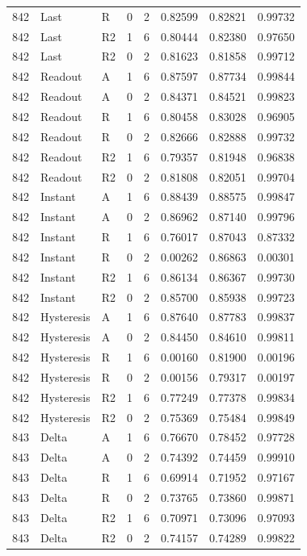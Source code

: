 \begin{longtable}{llllllll}
842 & Last & R & 0 & 2 & 0.82599 & 0.82821 & 0.99732 \\
842 & Last & R2 & 1 & 6 & 0.80444 & 0.82380 & 0.97650 \\
842 & Last & R2 & 0 & 2 & 0.81623 & 0.81858 & 0.99712 \\
842 & Readout & A & 1 & 6 & 0.87597 & 0.87734 & 0.99844 \\
842 & Readout & A & 0 & 2 & 0.84371 & 0.84521 & 0.99823 \\
842 & Readout & R & 1 & 6 & 0.80458 & 0.83028 & 0.96905 \\
842 & Readout & R & 0 & 2 & 0.82666 & 0.82888 & 0.99732 \\
842 & Readout & R2 & 1 & 6 & 0.79357 & 0.81948 & 0.96838 \\
842 & Readout & R2 & 0 & 2 & 0.81808 & 0.82051 & 0.99704 \\
842 & Instant & A & 1 & 6 & 0.88439 & 0.88575 & 0.99847 \\
842 & Instant & A & 0 & 2 & 0.86962 & 0.87140 & 0.99796 \\
842 & Instant & R & 1 & 6 & 0.76017 & 0.87043 & 0.87332 \\
842 & Instant & R & 0 & 2 & 0.00262 & 0.86863 & 0.00301 \\
842 & Instant & R2 & 1 & 6 & 0.86134 & 0.86367 & 0.99730 \\
842 & Instant & R2 & 0 & 2 & 0.85700 & 0.85938 & 0.99723 \\
842 & Hysteresis & A & 1 & 6 & 0.87640 & 0.87783 & 0.99837 \\
842 & Hysteresis & A & 0 & 2 & 0.84450 & 0.84610 & 0.99811 \\
842 & Hysteresis & R & 1 & 6 & 0.00160 & 0.81900 & 0.00196 \\
842 & Hysteresis & R & 0 & 2 & 0.00156 & 0.79317 & 0.00197 \\
842 & Hysteresis & R2 & 1 & 6 & 0.77249 & 0.77378 & 0.99834 \\
842 & Hysteresis & R2 & 0 & 2 & 0.75369 & 0.75484 & 0.99849 \\
843 & Delta & A & 1 & 6 & 0.76670 & 0.78452 & 0.97728 \\
843 & Delta & A & 0 & 2 & 0.74392 & 0.74459 & 0.99910 \\
843 & Delta & R & 1 & 6 & 0.69914 & 0.71952 & 0.97167 \\
843 & Delta & R & 0 & 2 & 0.73765 & 0.73860 & 0.99871 \\
843 & Delta & R2 & 1 & 6 & 0.70971 & 0.73096 & 0.97093 \\
843 & Delta & R2 & 0 & 2 & 0.74157 & 0.74289 & 0.99822 \\

\end{longtable}
